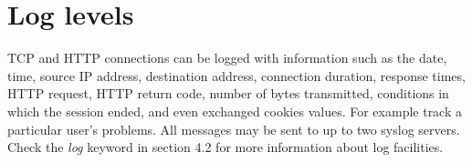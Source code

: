 
\section{Log levels}

TCP and HTTP connections can be logged with information such as the date, time,
source IP address, destination address, connection duration, response times,
HTTP request, HTTP return code, number of bytes transmitted, conditions
in which the session ended, and even exchanged cookies values. For example
track a particular user's problems. All messages may be sent to up to two
syslog servers. Check the \emph{log} keyword in section 4.2 for more information
about log facilities.

